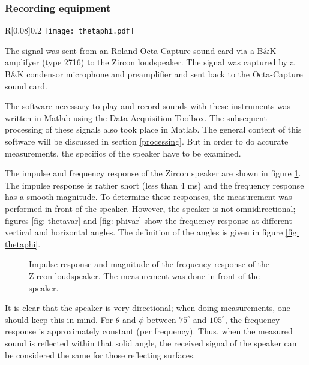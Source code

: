 \subsubsection{Recording equipment}
\begin{wrapfigure}{R}[0.08\textwidth]{0.2\textwidth}
  \centering
    \texttt{[image: thetaphi.pdf]}
  \caption{Definition of angles $\theta$ and $\phi$.}
  \label{fig: thetaphi}
\end{wrapfigure}

The signal was sent from an Roland Octa-Capture sound card via a B\&K amplifyer (type 2716) to the Zircon loudspeaker. The signal was captured by a B\&K condensor microphone and preamplifier and sent back to the Octa-Capture sound card.

The software necessary to play and record sounds with these instruments was written in Matlab using the Data Acquisition Toolbox. The subsequent processing of these signals also took place in Matlab. The general content of this software will be discussed in section \ref{processing}. But in order to do accurate measurements, the specifics of the speaker have to be examined.

The impulse and frequency response of the Zircon speaker are shown in figure \ref{fig: ZirconImp}. The impulse response is rather short (less than 4 ms) and the frequency response has a smooth magnitude. To determine these responses, the measurement was performed in front of the speaker. However, the speaker is not omnidirectional; figures \ref{fig: thetavar} and \ref{fig: phivar} show the frequency response at different vertical and horizontal angles. The definition of the angles is given in figure \ref{fig: thetaphi}. 
\begin{figure}[h!]
  \centering
  \caption{Impulse response and magnitude of the frequency response of the Zircon loudspeaker. The measurement was done in front of the speaker. }
  \label{fig: ZirconImp}
\end{figure}


It is clear that the speaker is very directional; when doing measurements, one should keep this in mind. For $\theta$ and $\phi$ between $75^{\circ}$ and $105^{\circ}$, the frequency response is approximately constant (per frequency). Thus, when the measured sound is reflected within that solid angle, the received signal of the speaker can be considered the same for those reflecting surfaces.

